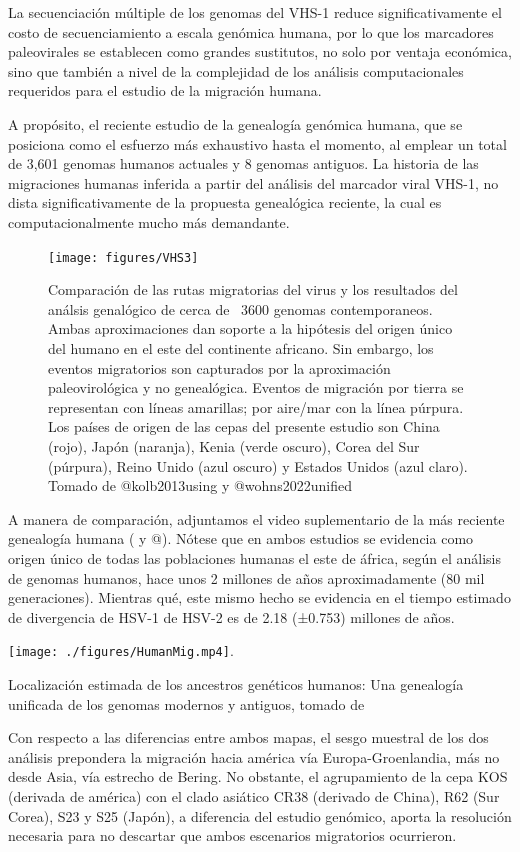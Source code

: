 \documentclass[
  12pt, krantz2,
  spanish,
]{krantz}
\begin{document}
La secuenciación múltiple de los genomas del VHS-1 reduce significativamente el costo de secuenciamiento a escala genómica humana, por lo que los marcadores paleovirales se establecen como grandes sustitutos, no solo por ventaja económica, sino que también a nivel de la complejidad de los análisis computacionales requeridos para el estudio de la migración humana.

A propósito, el reciente estudio de la genealogía genómica humana, que se posiciona como el esfuerzo más exhaustivo hasta el momento, al emplear un total de 3,601 genomas humanos actuales y 8 genomas antiguos. La historia de las migraciones humanas inferida a partir del análisis del marcador viral VHS-1, no dista significativamente de la propuesta genealógica reciente, la cual es computacionalmente mucho más demandante.

\begin{figure}
\texttt{[image: figures/VHS3]} \caption{Comparación de las rutas migratorias del virus y los resultados del análsis genalógico de cerca de ~3600 genomas contemporaneos. Ambas aproximaciones dan soporte a la hipótesis del origen único del humano en el este del continente africano. Sin embargo, los eventos migratorios son capturados por la aproximación paleovirológica y no genealógica. Eventos de migración por tierra se representan con líneas amarillas; por aire/mar con la línea púrpura. Los países de origen de las cepas del presente estudio son China (rojo), Japón (naranja), Kenia (verde oscuro), Corea del Sur (púrpura), Reino Unido (azul oscuro) y Estados Unidos (azul claro). Tomado de @kolb2013using y @wohns2022unified}\label{fig:migratory}
\end{figure}

A manera de comparación, adjuntamos el video suplementario de la más reciente genealogía humana (\citet{kolb2013using} y @\citet{wohns2022unified}). Nótese que en ambos estudios se evidencia como origen único de todas las poblaciones humanas el este de áfrica, según el análisis de genomas humanos, hace unos 2 millones de años aproximadamente (80 mil generaciones). Mientras qué, este mismo hecho se evidencia en el tiempo estimado de divergencia de HSV-1 de HSV-2 es de 2.18 (±0.753) millones de años.

\texttt{[image: ./figures/HumanMig.mp4]}.

Localización estimada de los ancestros genéticos humanos: Una genealogía unificada de los genomas modernos y antiguos, tomado de \citet{wohns2022unified}

Con respecto a las diferencias entre ambos mapas, el sesgo muestral de los dos análisis prepondera la migración hacia américa vía Europa-Groenlandia, más no desde Asia, vía estrecho de Bering. No obstante, el agrupamiento de la cepa KOS (derivada de américa) con el clado asiático CR38 (derivado de China), R62 (Sur Corea), S23 y S25 (Japón), a diferencia del estudio genómico, aporta la resolución necesaria para no descartar que ambos escenarios migratorios ocurrieron.
\end{document}
